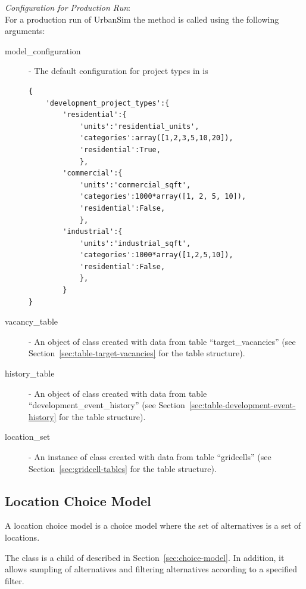 {\em Configuration for Production Run}:\\[1mm]
For a production run of UrbanSim the method  is called using the
following arguments:
\begin{description}
\item[model_configuration] - The default configuration for project types in
   is \label{page:model-configuration}
\begin{verbatim}
{
    'development_project_types':{
        'residential':{
            'units':'residential_units',
            'categories':array([1,2,3,5,10,20]),
            'residential':True,
            },
        'commercial':{
            'units':'commercial_sqft',
            'categories':1000*array([1, 2, 5, 10]),
            'residential':False,
            },
        'industrial':{
            'units':'industrial_sqft',
            'categories':1000*array([1,2,5,10]),
            'residential':False,
            },
        }
}
\end{verbatim}
\item[vacancy_table] - An object of class  created
  with data from table ``target_vacancies'' (see
  Section~\ref{sec:table-target-vacancies} for the table structure).
\item[history_table] - An object of class  created
  with data from table ``development_event_history'' (see
  Section~\ref{sec:table-development-event-history} for the  table structure).
\item[location_set] - An instance of class  created with
  data from table ``gridcells'' (see Section~\ref{sec:gridcell-tables} for the
  table structure).
\end{description}



\subsection{Location Choice Model}
\label{sec:location-choice-model}
A location choice model is a choice model where the set of alternatives is a
set of locations.

The class  is a child of  
described in Section~\ref{sec:choice-model}. In addition, it allows sampling
of alternatives and filtering alternatives according to a specified filter.


